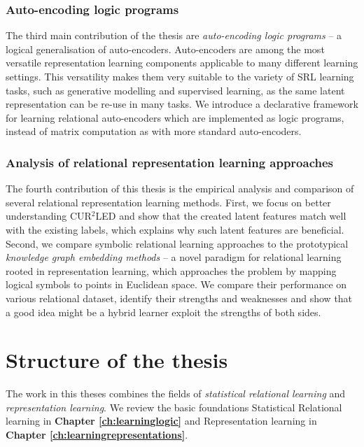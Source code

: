 \subsubsection{Auto-encoding logic programs}

The third main contribution of the thesis are \textit{auto-encoding logic programs} -- a logical generalisation of auto-encoders.
Auto-encoders are among the most versatile representation learning components applicable to many different learning settings.
This versatility makes them very suitable to the variety of SRL learning tasks, such as generative modelling and supervised learning, as the same latent representation can be re-use in many tasks.
We introduce a declarative framework for learning relational auto-encoders which are implemented as logic programs, instead of matrix computation as with more standard auto-encoders.






\subsubsection{Analysis of relational representation learning approaches}

The fourth contribution of this thesis is the empirical analysis and comparison of several relational representation learning methods.
First, we focus on better understanding CUR$^2$LED and show that the created latent features match well with the existing labels, which explains why such latent features are beneficial.
Second, we compare symbolic relational learning approaches to the prototypical \textit{knowledge graph embedding methods} -- a novel paradigm for relational learning rooted in representation learning, which approaches the problem by mapping logical symbols to points in Euclidean space.
We compare their performance on various relational dataset, identify their strengths and weaknesses and show that a good idea might be a hybrid learner exploit the strengths of both sides.








\section{Structure of the thesis}


The work in this theses combines the fields of \textit{statistical relational learning} and \textit{representation learning}.
We review the basic foundations Statistical Relational learning in \textbf{Chapter \ref{ch:learninglogic}} and Representation learning in \textbf{Chapter \ref{ch:learningrepresentations}}.



